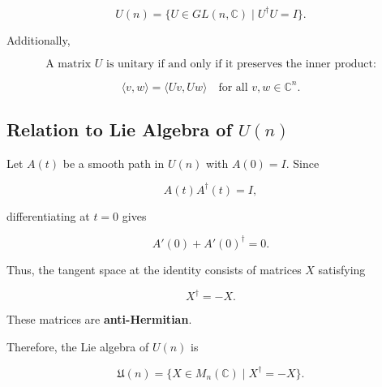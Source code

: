 \documentclass{article}
\theoremstyle{definition}
\begin{document}
\[
U(n) = \{ U \in GL(n,\mathbb{C}) \mid U^\dagger U = I \}.
\]

Additionally, 

\[
\text{A matrix } U \text{ is unitary if and only if it preserves the inner product:}
\]

\[
\langle v,w\rangle = \langle Uv, Uw\rangle
\quad \text{for all } v,w \in \mathbb{C}^n.
\]

\subsection*{Relation to Lie Algebra of $U(n)$}

Let $A(t)$ be a smooth path in $U(n)$ with $A(0) = I$.  
Since

\[
A(t) A^\dagger(t) = I,
\]

differentiating at $t=0$ gives

\[
A'(0) + A'(0)^\dagger = 0.
\]

Thus, the tangent space at the identity consists of matrices $X$ satisfying

\[
X^\dagger = -X.
\]

These matrices are \textbf{anti-Hermitian}.

Therefore, the Lie algebra of $U(n)$ is

\[
\mathfrak{U}(n)
=
\{ X \in M_n(\mathbb{C}) \mid X^\dagger = -X \}.
\]
\end{document}
